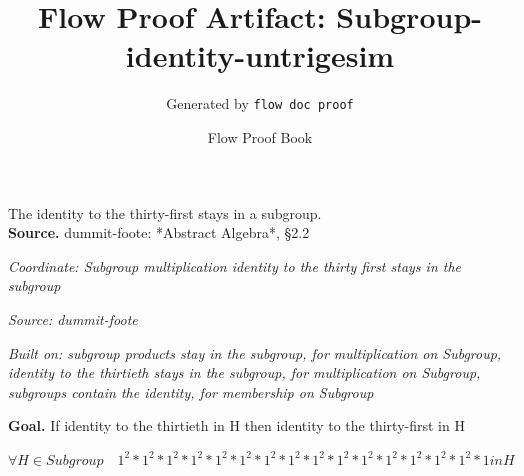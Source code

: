 \documentclass[11pt]{article}
\title{Flow Proof Artifact: Subgroup-identity-untrigesim}
\author{Generated by \texttt{flow doc proof}}
\date{Flow Proof Book}
\theoremstyle{definition}
\begin{document}
\maketitle
The identity to the thirty-first stays in a subgroup.\\[0.5em]
\textbf{Source.} dummit-foote: *Abstract Algebra*, §2.2\\[0.5em]
\bigskip
{}\par
\smallskip\noindent\textit{Coordinate: Subgroup \cdot multiplication \cdot identity to the thirty first stays in the subgroup}\par
\smallskip\noindent\textit{Source: dummit-foote}\par
\smallskip\noindent\textit{Built on: subgroup products stay in the subgroup, for multiplication on Subgroup, identity to the thirtieth stays in the subgroup, for multiplication on Subgroup, subgroups contain the identity, for membership on Subgroup}\par
\medskip
\noindent\textbf{Goal.} If identity to the thirtieth in H then identity to the thirty-first in H\par
\noindent$\displaystyle \forall H \in Subgroup\quad 1^{2} * 1^{2} * 1^{2} * 1^{2} * 1^{2} * 1^{2} * 1^{2} * 1^{2} * 1^{2} * 1^{2} * 1^{2} * 1^{2} * 1^{2} * 1^{2} * 1^{2} * 1 in H$\par
\medskip
\noindent
\end{document}
